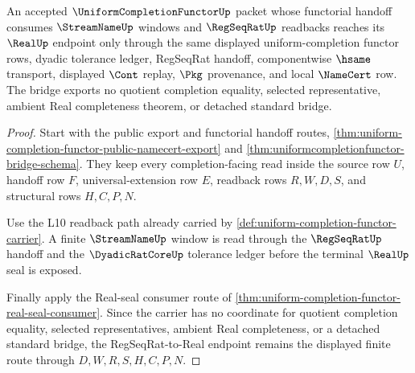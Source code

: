\begin{theorem}
\label{thm:uniform-completion-functor-regseq-real-bridge}
An accepted $\UniformCompletionFunctorUp$ packet whose functorial handoff consumes $\StreamNameUp$ windows and $\RegSeqRatUp$ readbacks reaches its $\RealUp$ endpoint only through the same displayed uniform-completion functor rows, dyadic tolerance ledger, RegSeqRat handoff, componentwise $\hsame$ transport, displayed $\Cont$ replay, $\Pkg$ provenance, and local $\NameCert$ row. The bridge exports no quotient completion equality, selected representative, ambient Real completeness theorem, or detached standard bridge.
\end{theorem}
\begin{proof}
Start with the public export and functorial handoff routes, \autoref{thm:uniform-completion-functor-public-namecert-export} and \autoref{thm:uniformcompletionfunctor-bridge-schema}. They keep every completion-facing read inside the source row $U$, handoff row $F$, universal-extension row $E$, readback rows $R,W,D,S$, and structural rows $H,C,P,N$.

Use the L10 readback path already carried by \autoref{def:uniform-completion-functor-carrier}. A finite $\StreamNameUp$ window is read through the $\RegSeqRatUp$ handoff and the $\DyadicRatCoreUp$ tolerance ledger before the terminal $\RealUp$ seal is exposed.

Finally apply the Real-seal consumer route of \autoref{thm:uniform-completion-functor-real-seal-consumer}. Since the carrier has no coordinate for quotient completion equality, selected representatives, ambient Real completeness, or a detached standard bridge, the RegSeqRat-to-Real endpoint remains the displayed finite route through $D,W,R,S,H,C,P,N$.
\end{proof}

